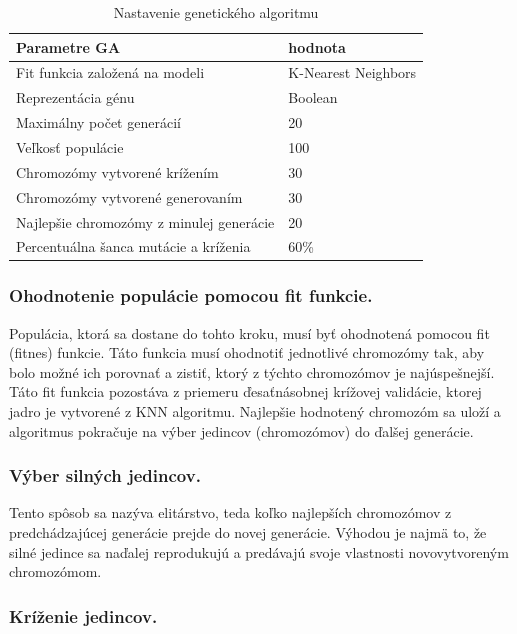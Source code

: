 \documentclass[runningheads]{llncs}
\begin{document}
\begin{table}[]
\centering
\caption{Nastavenie genetického algoritmu}\label{tab_nastavenie_gen_alg}
\begin{tabular}{|l|l|}
\hline
\textbf{Parametre GA}                    & \textbf{hodnota}  \\ \hline
Fit funkcia založená na modeli           & K-Nearest Neighbors \\ \hline
Reprezentácia génu                       & Boolean  \\ \hline
Maximálny počet generácií                & 20       \\ \hline
Veľkosť populácie                        & 100      \\ \hline
Chromozómy vytvorené krížením            & 30       \\ \hline
Chromozómy vytvorené generovaním         & 30       \\ \hline
Najlepšie chromozómy z minulej generácie & 20       \\ \hline
Percentuálna šanca mutácie a kríženia    & 60\%     \\ \hline
\end{tabular}
\end{table}

\subsubsection{Ohodnotenie populácie pomocou fit funkcie.}

Populácia, ktorá sa dostane do tohto kroku, musí byť ohodnotená pomocou fit (fitnes) funkcie. 
Táto funkcia musí ohodnotiť jednotlivé chromozómy tak, aby bolo možné ich porovnať a zistiť, ktorý
z týchto chromozómov je najúspešnejší. Táto fit funkcia pozostáva z priemeru ďesaťnásobnej krížovej validácie, ktorej jadro
je vytvorené z KNN algoritmu. Najlepšie hodnotený chromozóm sa uloží a algoritmus pokračuje
na výber jedincov (chromozómov) do ďalšej generácie.

\subsubsection{Výber silných jedincov.}

Tento spôsob sa nazýva elitárstvo, teda koľko najlepších chromozómov z predchádzajúcej generácie prejde
do novej generácie. Výhodou je najmä to, že silné jedince sa naďalej reprodukujú a predávajú svoje vlastnosti
novovytvoreným chromozómom.

\subsubsection{Kríženie jedincov.}
\end{document}
